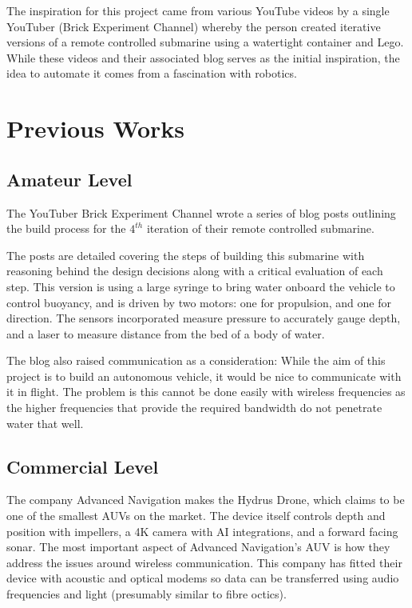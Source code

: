 \documentclass[11pt,a4paper,titlepage]{report}
\begin{document}
	The inspiration for this project came from various YouTube videos by a single YouTuber (Brick Experiment Channel\cite{BRICK_EXPERIMENT_CHANNEL_PROFILE}) whereby the person created iterative versions of a remote controlled submarine using a watertight container and Lego. While these videos and their associated blog\cite{BRICK_EXPERIMENT_CHANNEL_BLOG} serves as the initial inspiration, the idea to automate it comes from a fascination with robotics. 
	
	\section*{Previous Works}
	\subsection*{Amateur Level}
	The YouTuber Brick Experiment Channel\cite{BRICK_EXPERIMENT_CHANNEL_PROFILE} wrote a series of blog posts\cite{BRICK_EXPERIMENT_CHANNEL_BLOG} outlining the build process for the $4^{th}$ iteration of their remote controlled submarine. 
	
	The posts are detailed covering the steps of building this submarine with reasoning behind the design decisions along with a critical evaluation of each step. This version is using a large syringe to bring water onboard the vehicle to control buoyancy, and is driven by two motors: one for propulsion, and one for direction. The sensors incorporated measure pressure to accurately gauge depth, and a laser to measure distance from the bed of a body of water. 
		
	The blog also raised communication as a consideration: While the aim of this project is to build an autonomous vehicle, it would be nice to communicate with it in flight. The problem is this cannot be done easily with wireless frequencies as the higher frequencies that provide the required bandwidth do not penetrate water that well.
	
	\subsection*{Commercial Level}
	The company Advanced Navigation makes the Hydrus Drone\cite{ADVANCED_NAVIGATION_HYDRUS}, which claims to be one of the smallest AUVs on the market. The device itself controls depth and position with impellers, a 4K camera with AI integrations, and a forward facing sonar. The most important aspect of Advanced Navigation's AUV is how they address the issues around wireless communication. This company has fitted their device with acoustic and optical modems so data can be transferred using audio frequencies and light (presumably similar to fibre octics).
	
\end{document}
